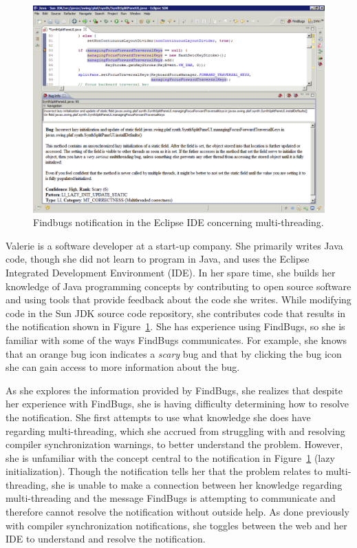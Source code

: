 \documentclass{llncs}
\begin{document}
\begin{figure} [ht]
	\centering
	\includegraphics[width=\textwidth]{figs/eclipse.png}
	\caption{Findbugs notification in the Eclipse IDE concerning multi-threading.}
	\label{fig:eclipse}
\end{figure} 

Valerie is a software developer at a start-up company. She primarily writes Java code, though she did not learn to program in Java, and uses the Eclipse Integrated Development Environment (IDE). In her spare time, she builds her knowledge of Java programming concepts by contributing to open source software and using tools that provide feedback about the code she writes. While modifying code in the Sun JDK source code repository, she contributes code that results in the notification shown in Figure~\ref{fig:eclipse}. She has experience using FindBugs, so she is familiar with some of the ways FindBugs communicates. For example, she knows that an orange bug icon indicates a \textit{scary} bug and that by clicking the bug icon she can gain access to more information about the bug.

As she explores the information provided by FindBugs, she realizes that despite her experience with FindBugs, she is having difficulty determining how to resolve the notification. She first attempts to use what knowledge she does have regarding multi-threading, which she accrued from struggling with and resolving compiler synchronization warnings, to better understand the problem. 
However, she is unfamiliar with the concept central to the notification in Figure~\ref{fig:eclipse} (lazy initialization). Though the notification tells her that the problem relates to multi-threading, she is unable to make a connection between her knowledge regarding multi-threading and the message FindBugs is attempting to communicate and therefore cannot resolve the notification without outside help. As done previously with compiler synchronization notifications, she toggles between the web and her IDE to understand and resolve the notification.
\end{document}
